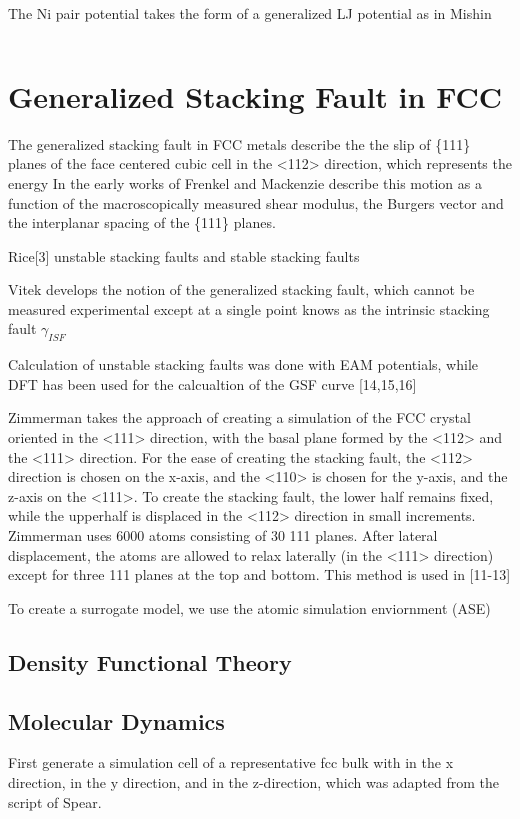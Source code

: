 The Ni pair potential takes the form of a generalized LJ potential as in Mishin\cite{mishin2004_eam_NiAl}

\begin{equation}
\label{eq:pair_mishin2004}
\end{equation}

\section{Generalized Stacking Fault in FCC}
The generalized stacking fault in FCC metals describe the the slip of \{111\} planes of the face centered cubic cell in the <112> direction, which represents the energy
In the early works of Frenkel and Mackenzie describe this motion as a function of the macroscopically measured shear modulus, the Burgers vector and the interplanar spacing of the \{111\} planes.

Rice[3] unstable stacking faults and stable stacking faults

Vitek\cite{vitek1966_gsf,vitek1968_gsf} develops the notion of the generalized stacking fault, which cannot be measured experimental except at a single point knows as the intrinsic stacking fault $\gamma_{ISF}$

Calculation of unstable stacking faults\cite{sun1990_eam_esf,sun1993_eam_esf,farkas1997_eam_usf} was done with EAM potentials, while DFT has been used for the calcualtion of the GSF curve [14,15,16]

Zimmerman takes the approach of creating a simulation of the FCC crystal oriented in the <111> direction, with the basal plane formed by the <112> and the <111> direction.  For the ease of creating the stacking fault, the <112> direction is chosen on the x-axis, and the <110> is chosen for the y-axis, and the z-axis on the <111>.  To create the stacking fault, the lower half remains fixed, while the upperhalf is displaced in the <112> direction in small increments.  Zimmerman uses 6000 atoms consisting of 30 {111} planes.  After lateral displacement, the atoms are allowed to relax laterally (in the <111> direction) except for three {111} planes at the top and bottom.  This method is used in [11-13]

To create a surrogate model, we use the atomic simulation enviornment (ASE)

\subsection{Density Functional Theory}



\subsection{Molecular Dynamics}

First generate a simulation cell of a representative fcc bulk with \hkl[1 1 2] in the x direction, \hkl[-1 1 0] in the y direction, and \hkl[-1 -1 1] in the z-direction, which was adapted from the script of Spear\cite{spear2012_lammps_gsf}.
